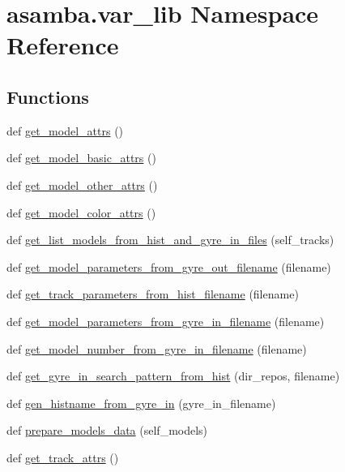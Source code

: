 \hypertarget{namespaceasamba_1_1var__lib}{}\section{asamba.\+var\+\_\+lib Namespace Reference}
\label{namespaceasamba_1_1var__lib}
\subsection*{Functions}
\begin{DoxyCompactItemize}
\item 
def \hyperlink{namespaceasamba_1_1var__lib_a0c87523dbf5108a45ba622f3a931ea61}{get\+\_\+model\+\_\+attrs} ()
\item 
def \hyperlink{namespaceasamba_1_1var__lib_a300a7811388375b1f7a3267412235a28}{get\+\_\+model\+\_\+basic\+\_\+attrs} ()
\item 
def \hyperlink{namespaceasamba_1_1var__lib_adc463e39504e5cd7acb15d499dec2880}{get\+\_\+model\+\_\+other\+\_\+attrs} ()
\item 
def \hyperlink{namespaceasamba_1_1var__lib_ac0c467d00e6be1fa027b3a79ef6ef2e2}{get\+\_\+model\+\_\+color\+\_\+attrs} ()
\item 
def \hyperlink{namespaceasamba_1_1var__lib_a31c9bde7f3cc889b6f3bd873d002dbf1}{get\+\_\+list\+\_\+models\+\_\+from\+\_\+hist\+\_\+and\+\_\+gyre\+\_\+in\+\_\+files} (self\+\_\+tracks)
\item 
def \hyperlink{namespaceasamba_1_1var__lib_a9ee4e5fb223a7df5e7795e850ab0cdcb}{get\+\_\+model\+\_\+parameters\+\_\+from\+\_\+gyre\+\_\+out\+\_\+filename} (filename)
\item 
def \hyperlink{namespaceasamba_1_1var__lib_a0aceded8224b425f6576bad342e05069}{get\+\_\+track\+\_\+parameters\+\_\+from\+\_\+hist\+\_\+filename} (filename)
\item 
def \hyperlink{namespaceasamba_1_1var__lib_a48d70ad01935d09c3c0bb434bc82a5e6}{get\+\_\+model\+\_\+parameters\+\_\+from\+\_\+gyre\+\_\+in\+\_\+filename} (filename)
\item 
def \hyperlink{namespaceasamba_1_1var__lib_a311dce219a4bfcd63933f8f319aa03ce}{get\+\_\+model\+\_\+number\+\_\+from\+\_\+gyre\+\_\+in\+\_\+filename} (filename)
\item 
def \hyperlink{namespaceasamba_1_1var__lib_a6872a059696addcf6898489c86fb9458}{get\+\_\+gyre\+\_\+in\+\_\+search\+\_\+pattern\+\_\+from\+\_\+hist} (dir\+\_\+repos, filename)
\item 
def \hyperlink{namespaceasamba_1_1var__lib_a1d691c904bf7b6452533eb7649170747}{gen\+\_\+histname\+\_\+from\+\_\+gyre\+\_\+in} (gyre\+\_\+in\+\_\+filename)
\item 
def \hyperlink{namespaceasamba_1_1var__lib_ac3a34f468d31f54f0d29486fbd1d3ab5}{prepare\+\_\+models\+\_\+data} (self\+\_\+models)
\item 
def \hyperlink{namespaceasamba_1_1var__lib_af9d74851b62f321dbf694bd2ef8fa3ed}{get\+\_\+track\+\_\+attrs} ()
\end{DoxyCompactItemize}
